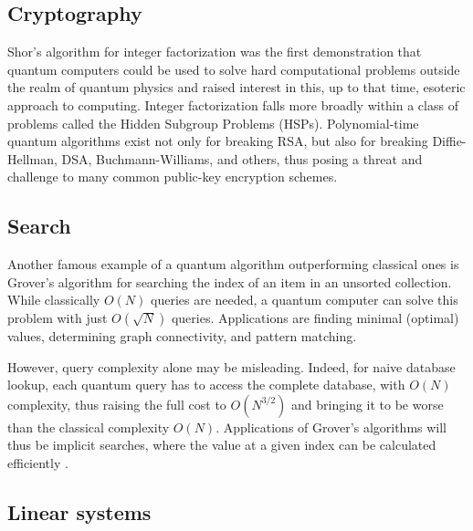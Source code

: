 \documentclass[journal]{IEEEtran}
\begin{document}
\subsection{Cryptography}
Shor's algorithm \cite{Shor1994} for integer factorization was the first demonstration that quantum computers could be used to solve hard computational problems outside the realm of quantum physics and raised interest in this, up to that time, esoteric approach to computing. Integer factorization falls more broadly within a class of problems called the Hidden Subgroup Problems (HSPs).  Polynomial-time quantum algorithms exist not only for breaking RSA, but also for breaking Diffie-Hellman, DSA, Buchmann-Williams, and others, thus posing a threat and challenge to many common public-key encryption schemes.

\subsection{Search}


Another famous example of a quantum algorithm outperforming classical ones is Grover's algorithm \cite{Grover1996} for searching the index of an item in an unsorted collection. While classically $O(N)$ queries are needed, a quantum computer can solve this problem with just $O(\sqrt{N})$ queries. Applications are finding minimal (optimal) values,  determining graph connectivity, and pattern matching.

However, query complexity alone may be misleading. %
 Indeed, for naive database lookup, each quantum query has to access the complete database, with $O(N)$ complexity, thus raising the full cost to $O(N^{3/2})$ and bringing it to be worse than the classical complexity $O(N)$. Applications of Grover's algorithms will thus be {\rm implicit} searches, where the value at a given index can be calculated efficiently \cite{MarkovGrover}. 

\subsection{Linear systems}
\end{document}
